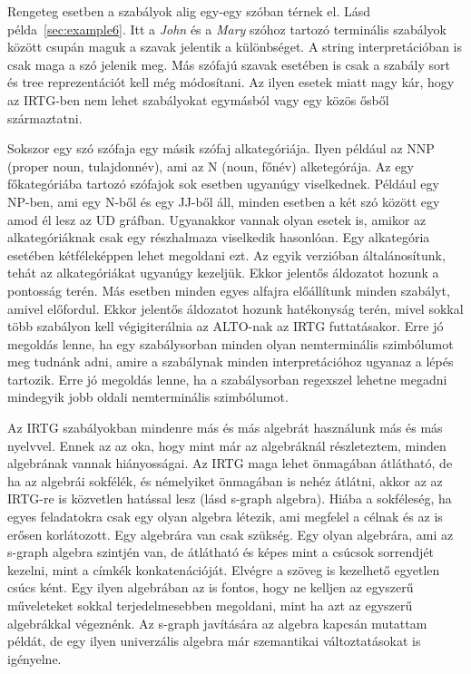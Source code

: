 Rengeteg esetben a szabályok alig egy-egy szóban térnek el. Lásd példa~\ref{sec:example6}.
Itt a \textit{John} és a \textit{Mary} szóhoz tartozó terminális szabályok között csupán maguk a szavak jelentik a különbséget. A string interpretációban is csak maga a szó jelenik meg. Más szófajú szavak esetében is csak a szabály sort és tree reprezentációt kell még módosítani. Az ilyen esetek miatt nagy kár, hogy az IRTG-ben nem lehet szabályokat egymásból vagy egy közös ősből származtatni.


Sokszor egy szó szófaja egy másik szófaj alkategóriája. Ilyen például az NNP (proper noun, tulajdonnév), ami az N (noun, főnév) alketegórája. Az egy főkategóriába tartozó szófajok sok esetben ugyanúgy viselkednek. Például egy NP-ben, ami egy N-ből és egy JJ-ből áll, minden esetben a két szó között egy amod él lesz az UD gráfban. Ugyanakkor vannak olyan esetek is, amikor az alkategóriáknak csak egy részhalmaza viselkedik hasonlóan. Egy alkategória esetében kétféleképpen lehet megoldani ezt. Az egyik verzióban általánosítunk, tehát az alkategóriákat ugyanúgy kezeljük. Ekkor jelentős áldozatot hozunk a pontosság terén. Más esetben minden egyes alfajra előállítunk minden szabályt, amivel előfordul. Ekkor jelentős áldozatot hozunk hatékonyság terén, mivel sokkal több szabályon kell végigiterálnia az ALTO-nak az IRTG futtatásakor. Erre jó megoldás lenne, ha egy szabálysorban minden olyan nemterminális szimbólumot meg tudnánk adni, amire a szabálynak minden interpretációhoz ugyanaz a lépés tartozik. Erre jó megoldás lenne, ha a szabálysorban regexszel lehetne megadni mindegyik jobb oldali nemterminális szimbólumot.


Az IRTG szabályokban mindenre más és más algebrát használunk más és más nyelvvel. Ennek az az oka, hogy mint már az algebráknál részleteztem, minden algebrának vannak hiányosságai. Az IRTG maga lehet önmagában átlátható, de ha az algebrái sokfélék, és némelyiket önmagában is nehéz átlátni, akkor az az IRTG-re is közvetlen hatással lesz (lásd s-graph algebra). Hiába a sokféleség, ha egyes feladatokra csak egy olyan algebra létezik, ami megfelel a célnak és az is erősen korlátozott. Egy algebrára van csak szükség. Egy olyan algebrára, ami az s-graph algebra szintjén van, de átlátható és képes mint a csúcsok sorrendjét kezelni, mint a címkék konkatenációját. Elvégre a szöveg is kezelhető egyetlen csúcs ként. Egy ilyen algebrában az is fontos, hogy ne kelljen az egyszerű műveleteket sokkal terjedelmesebben megoldani, mint ha azt az egyszerű algebrákkal végeznénk. Az s-graph javítására az algebra kapcsán mutattam példát, de egy ilyen univerzális algebra már szemantikai változtatásokat is igényelne.


